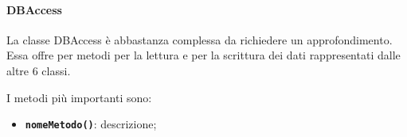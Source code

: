 \paragraph{DBAccess} 
La classe DBAccess è abbastanza complessa da richiedere un approfondimento.
Essa offre per metodi per la lettura e per la scrittura dei dati rappresentati dalle altre 6 classi.

I metodi più importanti sono:
\begin{itemize}
	\item \textbf{\texttt{nomeMetodo()}}: descrizione;

\end{itemize}


